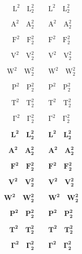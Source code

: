 \documentclass{article}
\begin{document}
\[
	\mathrm{L^2} \quad \mathrm{L^2_2} \qquad \textstyle \mathrm{L^2} \quad \mathrm{L^2_2}
\]

\[
	\mathrm{A^2} \quad \mathrm{A^2_2} \qquad \textstyle \mathrm{A^2} \quad \mathrm{A^2_2}
\]

\[
	\mathrm{F^2} \quad \mathrm{F^2_2} \qquad \textstyle \mathrm{F^2} \quad \mathrm{F^2_2}
\]

\[
	\mathrm{V^2} \quad \mathrm{V^2_2} \qquad \textstyle \mathrm{V^2} \quad \mathrm{V^2_2}
\]

\[
	\mathrm{W^2} \quad \mathrm{W^2_2} \qquad \textstyle \mathrm{W^2} \quad \mathrm{W^2_2}
\]

\[
	\mathrm{P^2} \quad \mathrm{P^2_2} \qquad \textstyle \mathrm{P^2} \quad \mathrm{P^2_2}
\]

\[
	\mathrm{T^2} \quad \mathrm{T^2_2} \qquad \textstyle \mathrm{T^2} \quad \mathrm{T^2_2}
\]

\[
	\mathrm{\Gamma^2} \quad \mathrm{\Gamma^2_2} \qquad \textstyle \mathrm{\Gamma^2} \quad \mathrm{\Gamma^2_2}
\]

\[
	\mathbf{L^2} \quad \mathbf{L^2_2} \qquad \textstyle \mathbf{L^2} \quad \mathbf{L^2_2}
\]

\[
	\mathbf{A^2} \quad \mathbf{A^2_2} \qquad \textstyle \mathbf{A^2} \quad \mathbf{A^2_2}
\]

\[
	\mathbf{F^2} \quad \mathbf{F^2_2} \qquad \textstyle \mathbf{F^2} \quad \mathbf{F^2_2}
\]

\[
	\mathbf{V^2} \quad \mathbf{V^2_2} \qquad \textstyle \mathbf{V^2} \quad \mathbf{V^2_2}
\]

\[
	\mathbf{W^2} \quad \mathbf{W^2_2} \qquad \textstyle \mathbf{W^2} \quad \mathbf{W^2_2}
\]

\[
	\mathbf{P^2} \quad \mathbf{P^2_2} \qquad \textstyle \mathbf{P^2} \quad \mathbf{P^2_2}
\]

\[
	\mathbf{T^2} \quad \mathbf{T^2_2} \qquad \textstyle \mathbf{T^2} \quad \mathbf{T^2_2}
\]

\[
	\mathbf{\Gamma^2} \quad \mathbf{\Gamma^2_2} \qquad \textstyle \mathbf{\Gamma^2} \quad \mathbf{\Gamma^2_2}
\]
\end{document}
